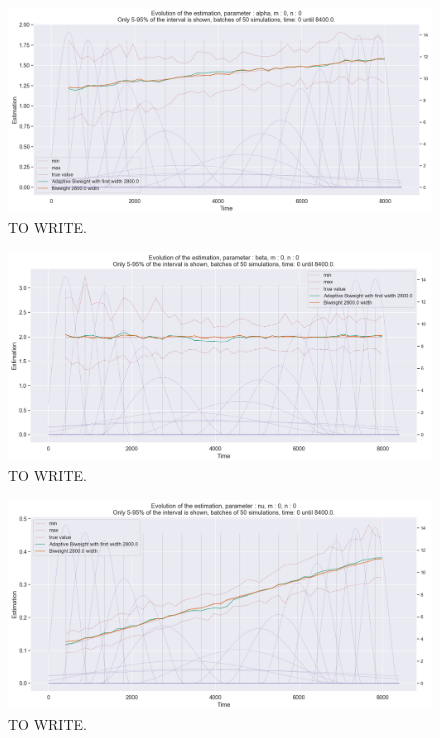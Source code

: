\begin{figure}
\centering
\includegraphics[width = 0.90 \textwidth]{../imag/chap3/1/D.png}
\caption{TO WRITE.}
\label{fig:first_estimate_1_alpha}
\end{figure}

\begin{figure}
\centering
\includegraphics[width = 0.90 \textwidth]{../imag/chap3/1/E.png}
\caption{TO WRITE.}
\label{fig:first_estimate_1_beta}
\end{figure}

\begin{figure}
\centering
\includegraphics[width = 0.90 \textwidth]{../imag/chap3/1/F.png}
\caption{TO WRITE.}
\label{fig:first_estimate_1_nu}
\end{figure}

















